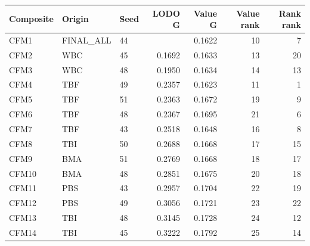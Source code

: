 \begin{tabular}{lllrrrr}
\hline
Composite & Origin & Seed & LODO G & Value G & Value rank & Rank rank \\
\hline
CFM1 & FINAL\_ALL & 44 &  & 0.1622 & 10 & 7 \\
CFM2 & WBC & 45 & 0.1692 & 0.1633 & 13 & 20 \\
CFM3 & WBC & 48 & 0.1950 & 0.1634 & 14 & 13 \\
CFM4 & TBF & 49 & 0.2357 & 0.1623 & 11 & 1 \\
CFM5 & TBF & 51 & 0.2363 & 0.1672 & 19 & 9 \\
CFM6 & TBF & 48 & 0.2367 & 0.1695 & 21 & 6 \\
CFM7 & TBF & 43 & 0.2518 & 0.1648 & 16 & 8 \\
CFM8 & TBI & 50 & 0.2688 & 0.1668 & 17 & 15 \\
CFM9 & BMA & 51 & 0.2769 & 0.1668 & 18 & 17 \\
CFM10 & BMA & 48 & 0.2851 & 0.1675 & 20 & 18 \\
CFM11 & PBS & 43 & 0.2957 & 0.1704 & 22 & 19 \\
CFM12 & PBS & 49 & 0.3056 & 0.1721 & 23 & 22 \\
CFM13 & TBI & 48 & 0.3145 & 0.1728 & 24 & 12 \\
CFM14 & TBI & 45 & 0.3222 & 0.1792 & 25 & 14 \\
\hline
\end{tabular}
